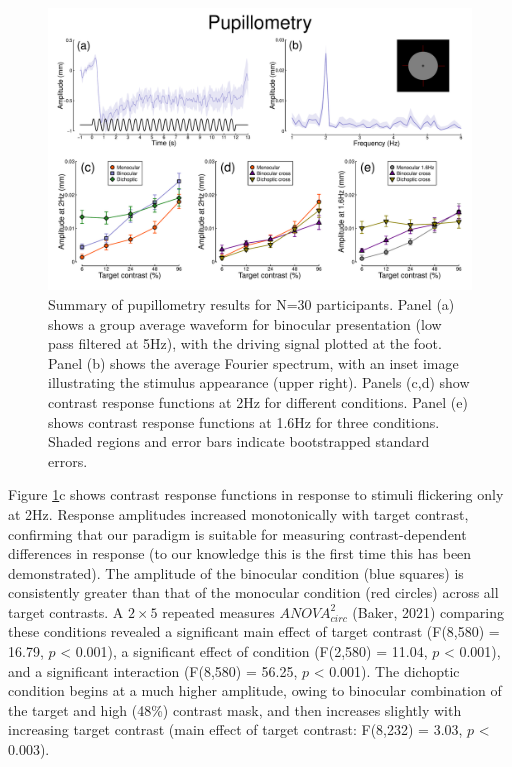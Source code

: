 \documentclass[
]{article}
\begin{document}
\begin{figure}

{\centering \includegraphics{Figures/pupildata} 

}

\caption{Summary of pupillometry results for N=30 participants. Panel (a) shows a group average waveform for binocular presentation (low pass filtered at 5Hz), with the driving signal plotted at the foot. Panel (b) shows the average Fourier spectrum, with an inset image illustrating the stimulus appearance (upper right). Panels (c,d) show contrast response functions at 2Hz for different conditions. Panel (e) shows contrast response functions at 1.6Hz for three conditions. Shaded regions and error bars indicate bootstrapped standard errors.}\label{fig:pupildata}
\end{figure}

Figure \ref{fig:pupildata}c shows contrast response functions in response to stimuli flickering only at 2Hz. Response amplitudes increased monotonically with target contrast, confirming that our paradigm is suitable for measuring contrast-dependent differences in response (to our knowledge this is the first time this has been demonstrated). The amplitude of the binocular condition (blue squares) is consistently greater than that of the monocular condition (red circles) across all target contrasts. A \(2\times5\) repeated measures \(ANOVA^2_{circ}\) (Baker, 2021) comparing these conditions revealed a significant main effect of target contrast (F(8,580) = 16.79, \(p\) \textless{} 0.001), a significant effect of condition (F(2,580) = 11.04, \(p\) \textless{} 0.001), and a significant interaction (F(8,580) = 56.25, \(p\) \textless{} 0.001). The dichoptic condition begins at a much higher amplitude, owing to binocular combination of the target and high (48\%) contrast mask, and then increases slightly with increasing target contrast (main effect of target contrast: F(8,232) = 3.03, \(p\) \textless{} 0.003).
\end{document}
